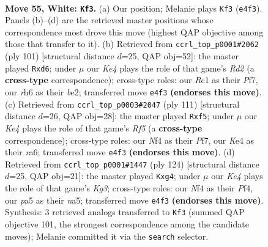 \documentclass[11pt]{article}
\begin{document}
\clearpage

\begin{figure}[p]\centering
\begin{subfigure}{0.46\textwidth}\centering
\resizebox{\linewidth}{!}{%
\newchessgame
\chessboard[
  setfen={5k2/3r1p2/7r/p7/3pKN2/1P6/R6P/2R5 w - - 4 55},
  showmover=false,
  pgfstyle=straightmove, color=movearrow, markmove={e4-f3}
]}
\caption{}
\end{subfigure}\hfill
\begin{subfigure}{0.46\textwidth}\centering
\resizebox{\linewidth}{!}{%
\newchessgame
\chessboard[
  setfen={8/3r1p2/2RP4/p2nkP2/P3p2P/6K1/4B3/8 b - - 0 51},
  showmover=false,
  pgfstyle=straightmove, color=movearrow, markmove={d7-d6}
]}
\caption{}
\end{subfigure}
\\[4pt]
\begin{subfigure}{0.46\textwidth}\centering
\resizebox{\linewidth}{!}{%
\newchessgame
\chessboard[
  setfen={8/5pk1/Rp5p/5P2/5r2/7P/P4PK1/8 b - - 2 56},
  showmover=false,
  pgfstyle=straightmove, color=movearrow, markmove={f4-f5}
]}
\caption{}
\end{subfigure}\hfill
\begin{subfigure}{0.46\textwidth}\centering
\resizebox{\linewidth}{!}{%
\newchessgame
\chessboard[
  setfen={8/4pk2/N7/np1r4/5Pp1/6K1/1P2R3/8 w - - 0 63},
  showmover=false,
  pgfstyle=straightmove, color=movearrow, markmove={g3-g4}
]}
\caption{}
\end{subfigure}
\caption{\textbf{Move 55, White: \texttt{Kf3}.} (a) Our position; Melanie plays \texttt{Kf3} (\texttt{e4f3}). Panels (b)--(d) are the retrieved master positions whose correspondence most drove this move (highest QAP objective among those that transfer to it). (b) Retrieved from \texttt{ccrl\_top\_p0001\#2062} (ply 101) [structural distance $d$=25, QAP obj=52]: the master played \texttt{Rxd6}; under $\mu$ our \emph{Ke4} plays the role of that game's \emph{Rd2} (a \textbf{cross-type} correspondence); cross-type roles: our \emph{R}c1 as their \emph{P}f7, our \emph{r}h6 as their \emph{b}e2; transferred move \texttt{e4f3} \textbf{(endorses this move)}. (c) Retrieved from \texttt{ccrl\_top\_p0003\#2047} (ply 111) [structural distance $d$=26, QAP obj=28]: the master played \texttt{Rxf5}; under $\mu$ our \emph{Ke4} plays the role of that game's \emph{Rf5} (a \textbf{cross-type} correspondence); cross-type roles: our \emph{N}f4 as their \emph{P}f7, our \emph{K}e4 as their \emph{r}a6; transferred move \texttt{e4f3} \textbf{(endorses this move)}. (d) Retrieved from \texttt{ccrl\_top\_p0001\#1447} (ply 124) [structural distance $d$=25, QAP obj=21]: the master played \texttt{Kxg4}; under $\mu$ our \emph{Ke4} plays the role of that game's \emph{Kg3}; cross-type roles: our \emph{N}f4 as their \emph{P}f4, our \emph{p}a5 as their \emph{n}a5; transferred move \texttt{e4f3} \textbf{(endorses this move)}. Synthesis: 3 retrieved analogs transferred to \texttt{Kf3} (summed QAP objective 101, the strongest correspondence among the candidate moves); Melanie committed it via the \texttt{search} selector.}
\label{fig:thought-m108}
\end{figure}
\end{document}

